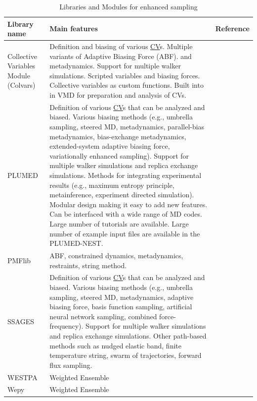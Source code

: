 \documentclass[9pt,review]{livecoms}
\begin{document}
\begin{table}[!ht]
\caption {Libraries and Modules for enhanced sampling}
\label{Table:Libraries}
\begin{tabularx}{0.95\textwidth}{
  || >{\raggedright\arraybackslash}l
  || >{\raggedright\arraybackslash}X
  | >{\raggedright\arraybackslash}l ||}
\hline
  Library name  & Main features                         & Reference \\
\hline
\hline
  Collective Variables Module (Colvars) & Definition and biasing of various \hyperlink{ref:CV} {CV}s.
  Multiple variants of Adaptive Biasing Force (ABF). and metadynamics. Support for multiple walker simulations. Scripted variables and biasing forces. Collective variables as custom functions.
  Built into in VMD for preparation and analysis of CVs. & \cite{Fiorin2013, Henin2022dashboard}\\
\hline
PLUMED        &  Definition of various \hyperlink{ref:CV} {CV}s that can be analyzed and biased. Various biasing methods (e.g., umbrella sampling, steered MD, metadynamics, parallel-bias metadynamics, bias-exchange metadynamics, extended-system adaptive biasing force, variationally enhanced sampling). Support for multiple walker simulations and replica exchange simulations. Methods for integrating experimental results (e.g., maximum entropy principle, metainference, experiment directed simulation). Modular design making it easy to add new features. Can be interfaced with a wide range of MD codes. Large number of tutorials are available. Large number of example input files are available in the PLUMED-NEST.         &  \cite{Bonomi-CPC-2009,Tribello2014,plumed-nest} \\
\hline
PMFlib        &  ABF, constrained dynamics, metadynamics, restraints, string method. &  \cite{kulhanek2011pmflib} \\
\hline
SSAGES & Definition of various \hyperlink{ref:CV} {CV}s that can be analyzed and biased. Various biasing methods (e.g., umbrella sampling, steered MD, metadynamics, adaptive biasing force, basis function sampling, artificial neural network sampling, combined force-frequency). Support for multiple walker simulations and replica exchange simulations. Other path-based methods such as nudged elastic band, finite temperature string, swarm of trajectories, forward flux sampling. & \cite{Sidky2018} \\
\hline
WESTPA        &   Weighted Ensemble     & \cite{Bogetti2019Suite, Russo_2022}  \\
\hline
Wepy          &  Weighted Ensemble  & \cite{samuel_d_lotz_2020_4270219} \\
\hline
\end{tabularx}
\end{table}
\end{document}
